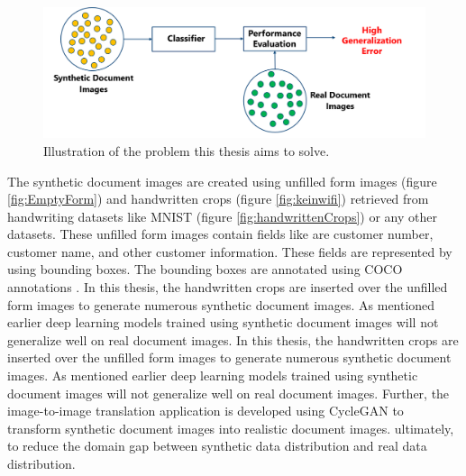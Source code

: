 \begin{figure}[H]
        \begin{center}
	    \includegraphics[scale=0.35]{images/Problem.png}
	    \caption[Illustration of the problem this thesis aims to solve.]{Illustration of the problem this thesis aims to solve.}
	    \label{fig:Problem}
	    \end{center}
\end{figure}





The synthetic document images are created using unfilled form images (figure \ref{fig:EmptyForm}) and handwritten crops (figure \ref{fig:keinwifi}) retrieved from handwriting datasets like \ac{MNIST} (figure \ref{fig:handwrittenCrops}) or any other datasets. These unfilled form images contain fields like are customer number, customer name, and other customer information. These fields are represented by using bounding boxes. The bounding boxes are annotated using \ac{COCO} annotations \cite{10.1007/978-3-319-10602-1_48}. In this thesis, the handwritten crops are inserted over the unfilled form images to generate numerous synthetic document images. As mentioned earlier deep learning models trained using synthetic document images will not generalize well on real document images. In this thesis, the handwritten crops are inserted over the unfilled form images to generate numerous synthetic document images. As mentioned earlier deep learning models trained using synthetic document images will not generalize well on real document images. Further, the image-to-image translation application is developed using \ac{CycleGAN} to transform synthetic document images into realistic document images. ultimately, to reduce the domain gap between synthetic data distribution and real data distribution. 


